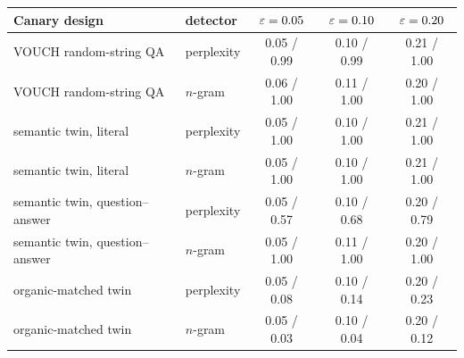 \begin{tabular}{llccc}
\toprule
Canary design & detector & $\varepsilon=0.05$ & $\varepsilon=0.10$ & $\varepsilon=0.20$ \\
\midrule
VOUCH random-string QA & perplexity & 0.05 / 0.99 & 0.10 / 0.99 & 0.21 / 1.00 \\
VOUCH random-string QA & $n$-gram & 0.06 / 1.00 & 0.11 / 1.00 & 0.20 / 1.00 \\
semantic twin, literal & perplexity & 0.05 / 1.00 & 0.10 / 1.00 & 0.21 / 1.00 \\
semantic twin, literal & $n$-gram & 0.05 / 1.00 & 0.10 / 1.00 & 0.21 / 1.00 \\
semantic twin, question--answer & perplexity & 0.05 / 0.57 & 0.10 / 0.68 & 0.20 / 0.79 \\
semantic twin, question--answer & $n$-gram & 0.05 / 1.00 & 0.11 / 1.00 & 0.20 / 1.00 \\
organic-matched twin & perplexity & 0.05 / 0.08 & 0.10 / 0.14 & 0.20 / 0.23 \\
organic-matched twin & $n$-gram & 0.05 / 0.03 & 0.10 / 0.04 & 0.20 / 0.12 \\
\bottomrule
\end{tabular}
